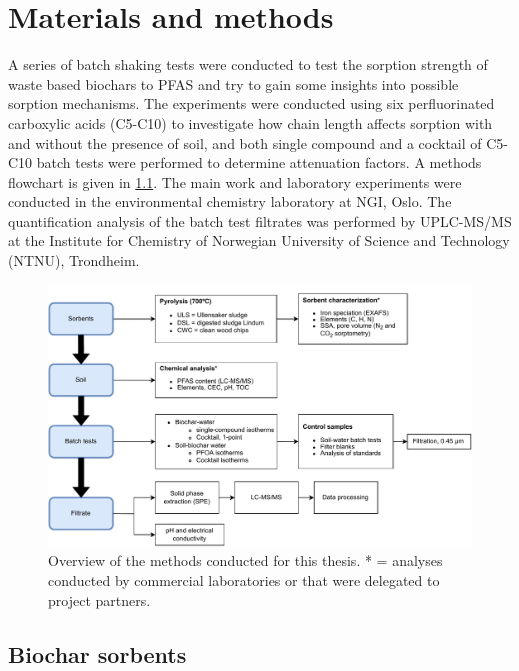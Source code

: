 \chapter{Materials and methods}\label{chap:MatlsMethds}
A series of batch shaking tests were conducted to test the sorption strength of waste based biochars to PFAS and try to gain some insights into possible sorption mechanisms. The experiments were conducted using six perfluorinated carboxylic acids (C5-C10) to investigate how chain length affects sorption with and without the presence of soil, and both single compound and a cocktail of C5-C10 batch tests were performed to determine attenuation factors. A methods flowchart is given in \cref{fig:methodoverview}. The main work and laboratory experiments were conducted in the environmental chemistry laboratory at NGI, Oslo. The quantification analysis of the batch test filtrates was performed by UPLC-MS/MS at the Institute for Chemistry of Norwegian University of Science and Technology (NTNU), Trondheim. 

\begin{figure}
    \centering
    \includegraphics[width=\textwidth]{Diagrams/Methods-General_overview_methods.pdf}
    \caption{Overview of the methods conducted for this thesis. * = analyses conducted by commercial laboratories or that were delegated to project partners.}
    \label{fig:methodoverview}
\end{figure}

\section{Biochar sorbents}

